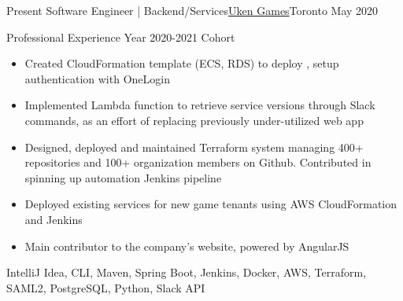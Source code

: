 %
%
%
\begin{experiences}
  \experience
    {Present}   {Software Engineer | Backend/Services}{\href{https://uken.com}{Uken Games}}{Toronto}
    {May 2020} {
                    Professional Experience Year 2020-2021 Cohort 
                    \begin{itemize}
                        \item Created CloudFormation template (ECS, RDS) to deploy , setup authentication with OneLogin
                        
                        \item Implemented Lambda function to retrieve service versions through Slack commands, as an effort of replacing previously under-utilized web app
                        
                        \item Designed, deployed and maintained Terraform system managing 400+ repositories and 100+ organization members on Github. Contributed in spinning up automation Jenkins pipeline
                        
                        \item Deployed existing services for new game tenants using AWS CloudFormation and Jenkins
                        
                        \item Main contributor to the company's website, powered by AngularJS
                    \end{itemize}
                    }
                    {IntelliJ Idea, CLI, Maven, Spring Boot, Jenkins, Docker, AWS, Terraform, SAML2, PostgreSQL, Python, Slack API}
\end{experiences}
